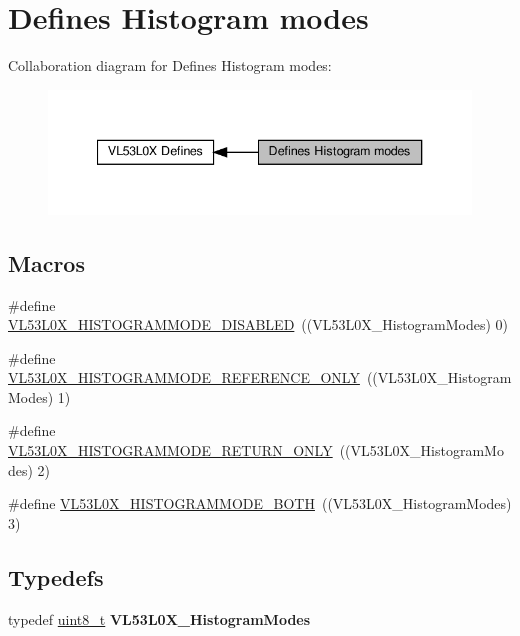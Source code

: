 \hypertarget{group__VL53L0X__define__HistogramModes__group}{}\section{Defines Histogram modes}
\label{group__VL53L0X__define__HistogramModes__group}
Collaboration diagram for Defines Histogram modes\+:\nopagebreak
\begin{figure}[H]
\begin{center}
\leavevmode
\includegraphics[width=340pt]{group__VL53L0X__define__HistogramModes__group}
\end{center}
\end{figure}
\subsection*{Macros}
\begin{DoxyCompactItemize}
\item 
\#define \hyperlink{group__VL53L0X__define__HistogramModes__group_ga1be8e446d952e6e70207159ede19e3f8}{V\+L53\+L0\+X\+\_\+\+H\+I\+S\+T\+O\+G\+R\+A\+M\+M\+O\+D\+E\+\_\+\+D\+I\+S\+A\+B\+L\+ED}~((V\+L53\+L0\+X\+\_\+\+Histogram\+Modes) 0)
\item 
\#define \hyperlink{group__VL53L0X__define__HistogramModes__group_ga1e0e3d9f63b1376c0e4e97cd23640674}{V\+L53\+L0\+X\+\_\+\+H\+I\+S\+T\+O\+G\+R\+A\+M\+M\+O\+D\+E\+\_\+\+R\+E\+F\+E\+R\+E\+N\+C\+E\+\_\+\+O\+N\+LY}~((V\+L53\+L0\+X\+\_\+\+Histogram\+Modes) 1)
\item 
\#define \hyperlink{group__VL53L0X__define__HistogramModes__group_gaf37229d15d3cb3330e4d8de4d49741dd}{V\+L53\+L0\+X\+\_\+\+H\+I\+S\+T\+O\+G\+R\+A\+M\+M\+O\+D\+E\+\_\+\+R\+E\+T\+U\+R\+N\+\_\+\+O\+N\+LY}~((V\+L53\+L0\+X\+\_\+\+Histogram\+Modes) 2)
\item 
\#define \hyperlink{group__VL53L0X__define__HistogramModes__group_gac06efee5e5499ec3a8c09d5a20a1d2b8}{V\+L53\+L0\+X\+\_\+\+H\+I\+S\+T\+O\+G\+R\+A\+M\+M\+O\+D\+E\+\_\+\+B\+O\+TH}~((V\+L53\+L0\+X\+\_\+\+Histogram\+Modes) 3)
\end{DoxyCompactItemize}
\subsection*{Typedefs}
\begin{DoxyCompactItemize}
\item 
\mbox{\label{group__VL53L0X__define__HistogramModes__group_ga3248067155806886b6bf1b10eaa83ea4}} 
typedef \hyperlink{vl53l0x__types_8h_aba7bc1797add20fe3efdf37ced1182c5}{uint8\+\_\+t} {\bfseries V\+L53\+L0\+X\+\_\+\+Histogram\+Modes}
\end{DoxyCompactItemize}



